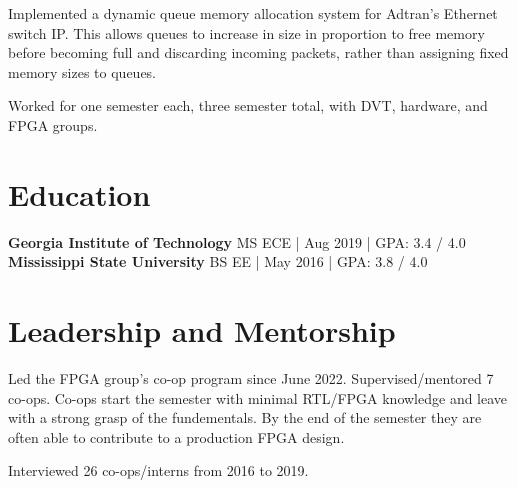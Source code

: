 \documentclass[10pt]{deedy-resume-reversed}
\begin{document}
\begin{minipage}[t]{1.0\textwidth}
\begin{tightemize}
\item Implemented a dynamic queue memory allocation system for Adtran’s Ethernet switch IP. 
This allows queues to increase in size in proportion to free memory before becoming full and discarding incoming packets,
rather than assigning fixed memory sizes to queues. 
\end{tightemize}
\sectionsep

\begin{tightemize}
\item Worked for one semester each, three semester total, with DVT, hardware, and FPGA groups.
\end{tightemize}
\sectionsep



\section{Education}
\textbf{Georgia Institute of Technology} MS ECE | Aug 2019 | GPA: 3.4 / 4.0 \\ 
\textbf{Mississippi State University} BS EE | May 2016 | GPA: 3.8 / 4.0 \\
\sectionsep


\section{Leadership and Mentorship}
\vspace{\topsep} %
\begin{tightemize}
\item Led the FPGA group's co-op program since June 2022. Supervised/mentored 7 co-ops.
Co-ops start the semester with minimal RTL/FPGA knowledge and leave with a strong grasp of 
the fundementals. By the end of the semester they are often able to contribute to a production FPGA design. 
\item Interviewed 26 co-ops/interns from 2016 to 2019.
\end{tightemize}
\sectionsep


\end{minipage}
\end{document}
